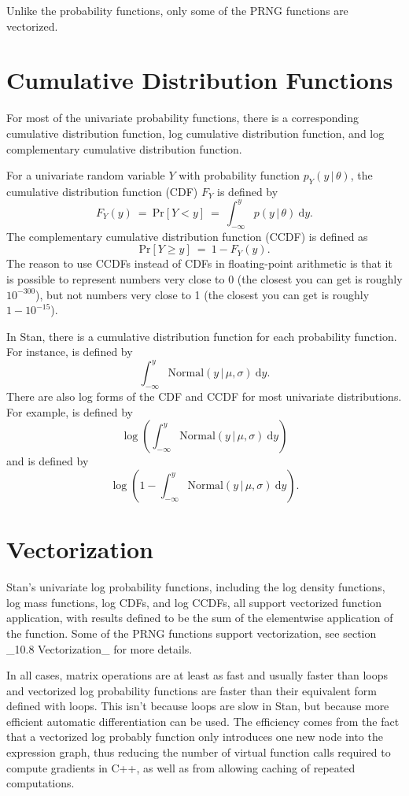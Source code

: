 \begin{description}
{\begin{description}
Unlike the probability functions, only some of the PRNG functions are vectorized.


\section{Cumulative Distribution Functions}


For most of the univariate probability functions, there is a corresponding cumulative distribution function, log cumulative distribution function, and log complementary cumulative distribution function.


For a univariate random variable $Y$ with probability function $p_Y(y \, | \, \theta)$, the cumulative distribution function (CDF) $F_Y$ is defined by \[ F_Y(y) \ = \ \text{Pr}[Y < y] \ = \ \int_{-\infty}^y p(y \, | \, \theta) \ \text{d}y. \] The complementary cumulative distribution function (CCDF) is defined as \[ \text{Pr}[Y \geq y] \ = \ 1 - F_Y(y). \] The reason to use CCDFs instead of CDFs in floating-point arithmetic is that it is possible to represent numbers very close to 0 (the closest you can get is roughly $10^{-300}$), but not numbers very close to 1 (the closest you can get is roughly $1 - 10^{-15}$).


In Stan, there is a cumulative distribution function for each probability function.  For instance,  is defined by \[ \int_{-\infty}^y \text{Normal}(y \, | \, \mu, \sigma) \ \text{d}y. \] There are also log forms of the CDF and CCDF for most univariate distributions.  For example,  is defined by \[ \log \left( \int_{-\infty}^y \text{Normal}(y \, | \, \mu, \sigma) \   \text{d}y \right) \] and  is defined by \[ \log \left( 1 - \int_{-\infty}^y \text{Normal}(y \, | \, \mu, \sigma) \   \text{d}y \right). \] 

\section{Vectorization}\label{vectorization.section}


Stan's univariate log probability functions, including the log density functions, log mass functions, log CDFs, and log CCDFs, all support vectorized function application, with results defined to be the sum of the elementwise application of the function.  Some of the PRNG functions support vectorization, see section _10.8 Vectorization_ for more details.


In all cases, matrix operations are at least as fast and usually faster than loops and vectorized log probability functions are faster than their equivalent form defined with loops.  This isn't because loops are slow in Stan, but because more efficient automatic differentiation can be used.  The efficiency comes from the fact that a vectorized log probably function only introduces one new node into the expression graph, thus reducing the number of virtual function calls required to compute gradients in  C++, as well as from allowing caching of repeated computations.



\end{description}}
\end{description}

